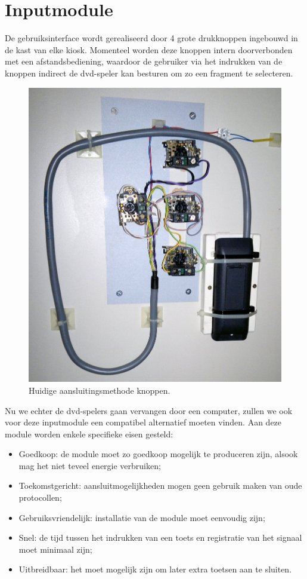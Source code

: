 \section{Inputmodule}
\label{ontwerp:hardware:input}

De gebruiksinterface wordt gerealiseerd door 4 grote drukknoppen ingebouwd in de kast van elke kiosk. Momenteel worden deze knoppen intern doorverbonden met een afstandsbediening, waardoor de gebruiker via het indrukken van de knoppen indirect de \acs{dvd}-speler kan besturen om zo een fragment te selecteren.

\begin{figure}
	\includegraphics[width=\textwidth]{afbeeldingen/kiosk_knoppen}
	\caption{Huidige aansluitingsmethode knoppen.}
\end{figure}

Nu we echter de \acs{dvd}-spelers gaan vervangen door een computer, zullen we ook voor deze inputmodule een compatibel alternatief moeten vinden. Aan deze module worden enkele specifieke eisen gesteld:
\begin{itemize}
\item Goedkoop: de module moet zo goedkoop mogelijk te produceren zijn, alsook mag het niet teveel energie verbruiken;
\item Toekomstgericht: aansluitmogelijkheden mogen geen gebruik maken van oude protocollen;
\item Gebruiksvriendelijk: installatie van de module moet eenvoudig zijn;
\item Snel: de tijd tussen het indrukken van een toets en registratie van het signaal moet minimaal zijn;
\item Uitbreidbaar: het moet mogelijk zijn om later extra toetsen aan te sluiten.
\end{itemize}

